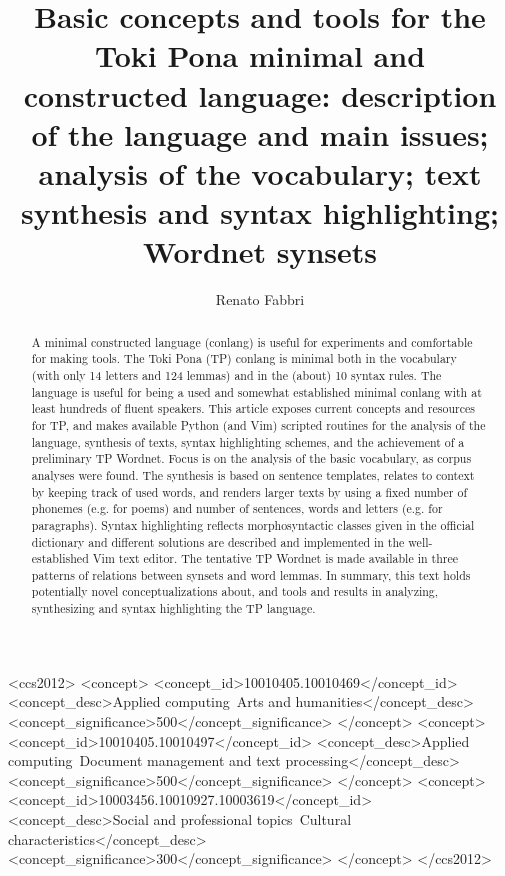 \documentclass[format=acmsmall, review=false, screen=true]{acmart}
\begin{document}
\title[A Multifrequency MAC for Wireless Sensor]{Basic concepts and tools for the Toki Pona minimal and constructed language: description of the language and main issues; analysis of the vocabulary; text synthesis and syntax highlighting; Wordnet synsets}

\author{Renato Fabbri}

\begin{abstract}
A minimal constructed language (conlang)
is useful for experiments and comfortable for making tools.
The Toki Pona (TP) conlang is minimal both in the vocabulary
(with only 14 letters and 124 lemmas)
and in the (about) 10 syntax rules.
The language is useful for being a used and somewhat established
minimal conlang with at least hundreds of fluent speakers.
This article exposes current concepts and resources
for TP,
  and makes available Python (and Vim) scripted routines for
the analysis of the language,
synthesis of texts, syntax highlighting schemes,
  and the achievement of a preliminary TP Wordnet.
Focus is on the analysis of the basic vocabulary,
as corpus analyses were found.
The synthesis is based on sentence templates,
relates to context by keeping track of used words,
and renders larger texts by using a fixed number of phonemes (e.g. for poems)
and number of sentences, words and letters (e.g. for paragraphs).
Syntax highlighting 
reflects morphosyntactic classes given in the official dictionary
and different solutions are described and implemented
in the well-established Vim text editor.
The tentative TP Wordnet is made available in three patterns
  of relations between synsets and word lemmas.
In summary, this text holds potentially novel conceptualizations about,
and tools and results in analyzing, synthesizing and syntax highlighting the
TP language.
\end{abstract}


%
%
\begin{CCSXML}
<ccs2012>
 <concept>
  <concept_id>10010405.10010469</concept_id>
  <concept_desc>Applied computing~Arts and humanities</concept_desc>
  <concept_significance>500</concept_significance>
 </concept>
 <concept>
  <concept_id>10010405.10010497</concept_id>
  <concept_desc>Applied computing~Document management and text processing</concept_desc>
  <concept_significance>500</concept_significance>
 </concept>
 <concept>
  <concept_id>10003456.10010927.10003619</concept_id>
  <concept_desc>Social and professional topics~Cultural characteristics</concept_desc>
  <concept_significance>300</concept_significance>
 </concept>
</ccs2012>
\end{CCSXML}
\end{document}
